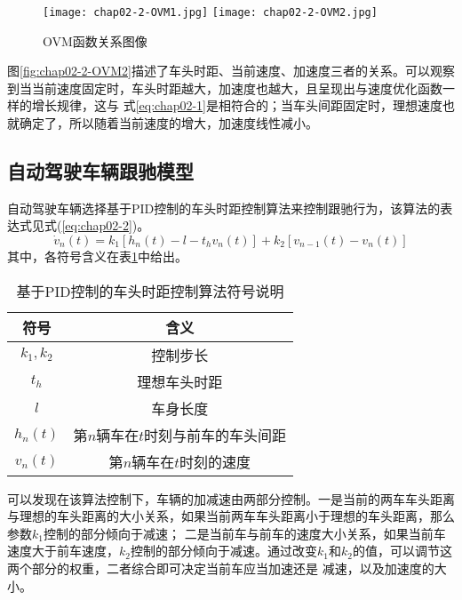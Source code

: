 \begin{figure}
  \centering
    {\texttt{[image: chap02-2-OVM1.jpg]}}
    {\texttt{[image: chap02-2-OVM2.jpg]}}
  \caption{OVM函数关系图像}
  \label{fig:chap02-2-OVM}
\end{figure}

图\ref{fig:chap02-2-OVM2}描述了车头时距、当前速度、加速度三者的关系。可以观察到当当前速度固定时，车头时距越大，加速度也越大，且呈现出与速度优化函数一样的增长规律，这与
式\ref{eq:chap02-1}是相符合的；当车头间距固定时，理想速度也就确定了，所以随着当前速度的增大，加速度线性减小。

\subsection{自动驾驶车辆跟驰模型}

自动驾驶车辆选择基于PID控制的车头时距控制算法来控制跟驰行为，该算法的表达式见式(\ref{eq:chap02-2})。
\begin{equation}
  \dot{v}_n(t) = k_1 \left[ h_n(t) - l - t_hv_n(t) \right] + k_2 \left[ v_{n-1}(t) - v_n(t) \right]
  \label{eq:chap02-2}
\end{equation}
其中，各符号含义在表\ref{tab:chap02-2}中给出。

\begin{table}
  \centering
  \caption{基于PID控制的车头时距控制算法符号说明}
  \begin{tabular}{cc}
    \toprule
    符号          &  含义                         \\
    \midrule
    $k_1, k_2$            & 控制步长         \\
    $t_h$                 & 理想车头时距             \\
    $l$                   & 车身长度          \\
    $h_n(t)$              & 第$n$辆车在$t$时刻与前车的车头间距        \\
    $v_n(t)$              & 第$n$辆车在$t$时刻的速度 \\
    \bottomrule
  \end{tabular}
  \label{tab:chap02-2}
\end{table}

可以发现在该算法控制下，车辆的加减速由两部分控制。一是当前的两车车头距离与理想的车头距离的大小关系，如果当前两车车头距离小于理想的车头距离，那么参数$k_1$控制的部分倾向于减速；
二是当前车与前车的速度大小关系，如果当前车速度大于前车速度，$k_2$控制的部分倾向于减速。通过改变$k_1$和$k_2$的值，可以调节这两个部分的权重，二者综合即可决定当前车应当加速还是
减速，以及加速度的大小。



